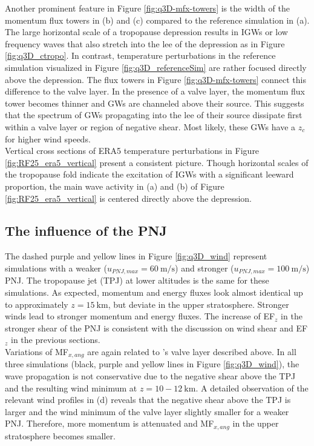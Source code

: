 Another prominent feature in Figure \ref{fig:q3D-mfx-towers} is the width of the momentum flux towers in (b) and (c) compared to the reference simulation in (a). The large horizontal scale of a tropopause depression results in IGWs or low frequency waves that also stretch into the lee of the depression as in Figure \ref{fig:q3D_ctropo}. In contrast, temperature perturbations in the reference simulation visualized in Figure \ref{fig:q3D_referenceSim} are rather focused directly above the depression. The flux towers in Figure \ref{fig:q3D-mfx-towers} connect this difference to the valve layer. In the presence of a valve layer, the momentum flux tower becomes thinner and GWs are channeled above their source. This suggests that the spectrum of GWs propagating into the lee of their source dissipate first within a valve layer or region of negative shear. Most likely, these GWs have a $z_c$ for higher wind speeds.\\
Vertical cross sections of ERA5 temperature perturbations in Figure \ref{fig:RF25_era5_vertical} present a consistent picture. Though horizontal scales of the tropopause fold indicate the excitation of IGWs with a significant leeward proportion, the main wave activity in (a) and (b) of Figure \ref{fig:RF25_era5_vertical} is centered directly above the depression.


\subsection*{The influence of the PNJ}
The dashed purple and yellow lines in Figure \ref{fig:q3D_wind} represent simulations with a weaker ($u_{PNJ,max}=\SI{60}{\meter\per\second}$) and stronger ($u_{PNJ,max}=\SI{100}{\meter\per\second}$) PNJ. The tropopause jet (TPJ) at lower altitudes is the same for these simulations. As expected, momentum and energy fluxes look almost identical up to approximately $z=\SI{15}{\kilo\meter}$, but deviate in the upper stratosphere. Stronger winds lead to stronger momentum and energy fluxes. The increase of EF$_z$ in the stronger shear of the PNJ is consistent with the discussion on wind shear and EF$_z$ in the previous sections.\\
Variations of MF$_{x,ang}$ are again related to \textcite[]{kruse_midlatitude_2016}'s valve layer described above. In all three simulations (black, purple and yellow lines in Figure \ref{fig:q3D_wind}), the wave propagation is not conservative due to the negative shear above the TPJ and the resulting wind minimum at $z=10-\SI{12}{\kilo\meter}$. A detailed observation of the relevant wind profiles in (d) reveals that the negative shear above the TPJ is larger and the wind minimum of the valve layer slightly smaller for a weaker PNJ. Therefore, more momentum is attenuated and MF$_{x,ang}$ in the upper stratosphere becomes smaller.


